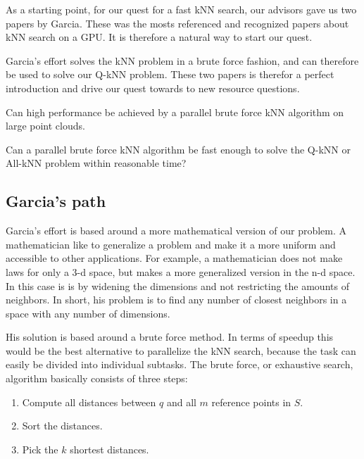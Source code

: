 As a starting point, for our quest for a fast kNN search, our advisors gave us two papers by Garcia\citep{Garcia2008, Garcia2010}. These was the mosts referenced and recognized papers about kNN search on a GPU\@. It is therefore a natural way to start our quest. 

Garcia's effort solves the kNN problem in a brute force fashion, and can therefore be used to solve our Q-kNN problem. These two papers is therefor a perfect introduction and drive our quest towards to new resource questions.  

\begin{myrq}
Can high performance be achieved by a parallel brute force kNN algorithm on large point clouds.
\label{rq:brute_force_performance}
\end{myrq}

\begin{myrq}
Can a parallel brute force kNN algorithm be fast enough to solve the Q-kNN or All-kNN problem within reasonable time?
\label{rq:brute_force_Q-kNN}
\end{myrq}


\subsection{Garcia's path} %
\label{sub:garcia_s_effort}
 
Garcia's effort is based around a more mathematical version of our problem. A mathematician like to generalize a problem and make it a more uniform and accessible to other applications. For example, a mathematician does not make laws for only a 3-d space, but makes a more generalized version in the n-d space. In this case is is by widening the dimensions and not restricting the amounts of neighbors. In short, his problem is to find any number of closest neighbors in a space with any number of dimensions.  

His solution is based around a brute force method. In terms of speedup this would be the best alternative to parallelize the kNN search, because the task can easily be divided into individual subtasks. The brute force, or exhaustive search, algorithm basically consists of three steps:

\begin{enumerate}
       \item Compute all distances between $q$ and all $m$ reference points in $S$.
       \item Sort the distances.
       \item Pick the $k$ shortest distances.
\end{enumerate}   


